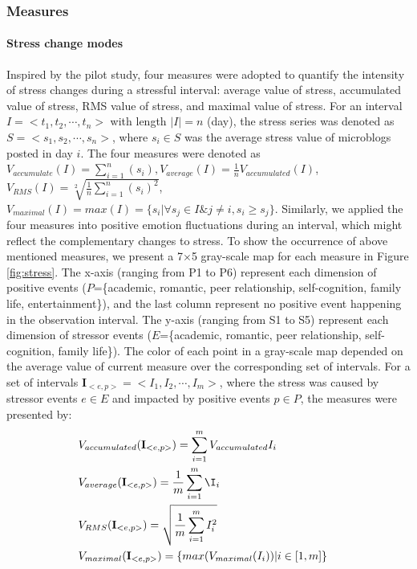 \subsubsection{Measures}
\label{subsubM}
\paragraph{\textbf{Stress change modes}}
Inspired by the pilot study,
four measures were adopted to quantify the intensity of stress changes during a stressful interval:
average value of stress, accumulated value of stress, RMS value of stress, and maximal value of stress.
For an interval $I=<t_1,t_2,\cdots,t_n>$ with length $|I|=n$ (day),
the stress series was denoted as $S=<s_1,s_2,\cdots,s_n>$,
where $s_i \in S$ was the average stress value of microblogs posted in day $i$.
The four measures were denoted as
$V_{accumulate}(I)= \sum_{i=1}^{n}(s_i), V_{average}(I)= \frac{1}{n}V_{accumulated}(I)$,
$V_{RMS}(I) = \sqrt[2]{ \frac{1}{n}\sum_{i=1}^{n}{(s_i)^2}}$,
$V_{maximal}(I) = max(I) = \{s_i |\forall s_j \in I \& j \neq i, s_i \geq s_j\}$.
Similarly,
we applied the four measures into positive emotion fluctuations during an interval,
which might reflect the complementary changes to stress.
To show the occurrence of above mentioned measures,
we present a 7$\times$5 gray-scale map for each measure in Figure \ref{fig:stress}.
The x-axis (ranging from P1 to P6) represent each dimension of positive events
($P$=\{academic, romantic, peer relationship, self-cognition, family life, entertainment\}),
and the last column represent no positive event happening in the observation interval.
The y-axis (ranging from S1 to S5) represent each dimension of stressor events
($E$=\{academic, romantic, peer relationship, self-cognition, family life\}).
The color of each point in a gray-scale map depended on the average value of current measure
over the corresponding set of intervals.
For a set of intervals $\textbf{I}_{<e,p>} = <I_1,I_2,\cdots,I_m>$,
where the stress was caused by stressor events $e \in E$
and impacted by positive events $p \in P$,
the measures were presented by:
\begin{equation}
\begin{aligned}
& V_{accumulated}(\textbf{I}_{<e,p>})=\sum_{i=1}^m{V_{accumulated}I_i}&\\
& V_{average}(\textbf{I}_{<e,p>})=\frac{1}{m}\sum_{i=1}^m\I_i&\\
& V_{RMS}(\textbf{I}_{<e,p>})=\sqrt{\frac{1}{m}\sum_{i=1}^mI_i^2}&\\
& V_{maximal}(\textbf{I}_{<e,p>}) = \{max(V_{maximal}(I_i))|i\in[1,m]\} &
 \end{aligned}
 \end{equation}
